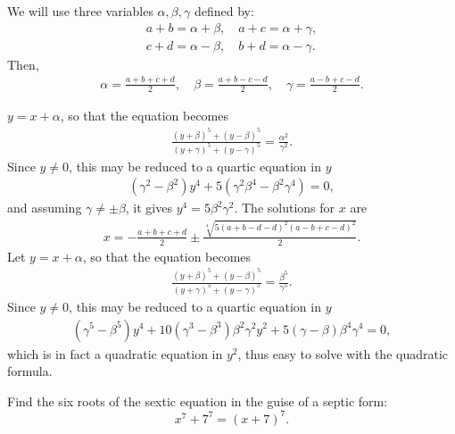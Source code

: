 \begin{solution}
    We will use three variables $\alpha, \beta, \gamma$ defined by:
    \begin{align*}
        a+b=\alpha+\beta, \quad a+c=\alpha+\gamma,\\
        c+d=\alpha-\beta, \quad b+d=\alpha-\gamma.
    \end{align*}
    Then,
    \begin{align*}
        \alpha = \frac{a+b+c+d}{2}, \quad \beta=\frac{a+b-c-d}{2}, \quad \gamma=\frac{a-b+c-d}{2}.
    \end{align*}
    \begin{tasks}
        \task $y=x+\alpha$, so that the equation becomes
        \begin{align*}
            \frac{(y+\beta)^5+(y-\beta)^5}{(y+\gamma)^5+(y-\gamma)^5}=\frac{\alpha^2}{\gamma^2}.
        \end{align*}
        Since $y\neq 0$, this may be reduced to a quartic equation in $y$
        \begin{align*}
            (\gamma^2-\beta^2)y^4 + 5(\gamma^2\beta^4-\beta^2\gamma^4)=0,
        \end{align*}
        and assuming $\gamma \neq \pm \beta$, it gives $y^4=5\beta^2\gamma^2$. The solutions for $x$ are
        \begin{align*}
            x=-\frac{a+b+c+d}{2}\pm\frac{\sqrt[4]{5(a+b-d-d)^2(a-b+c-d)^2}}{2}.
        \end{align*}
        \task Let $y=x+\alpha$, so that the equation becomes
        \begin{align*}
            \frac{(y+\beta)^5+(y-\beta)^5}{(y+\gamma)^5+(y-\gamma)^5}=\frac{\beta^5}{\gamma^5}.
        \end{align*}
        Since $y\neq 0$, this may be reduced to a quartic equation in $y$
        \begin{align*}
            (\gamma^5-\beta^5)y^4 + 10(\gamma^3-\beta^3)\beta^2\gamma^2y^2+5(\gamma-\beta)\beta^4\gamma^4=0,
        \end{align*}
        which is in fact a quadratic equation in $y^2$, thus easy to solve with the quadratic formula.
    \end{tasks}
\end{solution}



\begin{question}
    Find the six roots of the sextic equation in the guise of a septic form: $$x^7+7^7=(x+7)^7.$$
\end{question}

